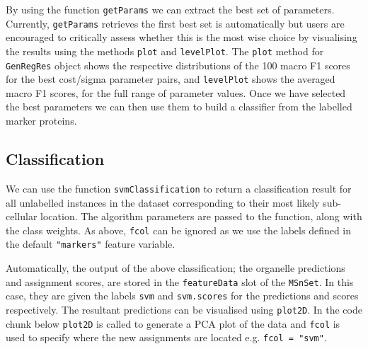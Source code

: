 By using the function \texttt{getParams} we can extract the best set of
parameters. Currently, \texttt{getParams} retrieves the first best set is
automatically but users are encouraged to critically assess whether
this is the most wise choice by visualising the results using the
methods \texttt{plot} and \texttt{levelPlot}. The \texttt{plot} method for \texttt{GenRegRes}
object shows the respective distributions of the 100 macro F1 scores
for the best cost/sigma parameter pairs, and \texttt{levelPlot} shows the
averaged macro F1 scores, for the full range of parameter values. Once
we have selected the best parameters we can then use them to build a
classifier from the labelled marker proteins. 

\subsection*{Classification}

We can use the function \texttt{svmClassification} to return a classification
result for all unlabelled instances in the dataset corresponding to
their most likely sub-cellular location. The algorithm parameters are
passed to the function, along with the class weights. As above, \texttt{fcol}
can be ignored as we use the labels defined in the default \texttt{"markers"}
feature variable.

\begin{knitrout}
\color{fgcolor}\begin{kframe}
\begin{alltt}
 \hlkwb{<-} 
                         
                         \hlstd{=} \hlstd{)}
\end{alltt}
\end{kframe}
\end{knitrout}

Automatically, the output of the above classification; the organelle
predictions and assignment scores, are stored in the
\texttt{featureData} slot of the \texttt{MSnSet}. In this case, they
are given the labels \texttt{svm} and \texttt{svm.scores} for the
predictions and scores respectively. The resultant predictions can be
visualised using \texttt{plot2D}. In the code chunk below
\texttt{plot2D} is called to generate a PCA plot of the data and
\texttt{fcol} is used to specify where the new assignments are located
e.g.  \texttt{fcol = "svm"}.

